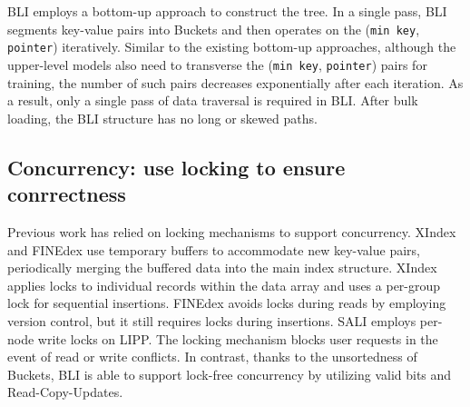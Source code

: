 BLI employs a bottom-up approach to construct the tree. In a single pass, BLI segments key-value pairs into Buckets and then operates on the (\texttt{min key}, \texttt{pointer}) iteratively. Similar to the existing bottom-up approaches, although the upper-level models also need to transverse the (\texttt{min key}, \texttt{pointer}) pairs for training, the number of such pairs decreases exponentially after each iteration. As a result, only a single pass of data traversal is required in BLI. After bulk loading, the BLI structure has no long or skewed paths.

\subsection{Concurrency: use locking to ensure conrrectness}
Previous work has relied on locking mechanisms to support concurrency. XIndex \cite{tang2020xindex} and FINEdex \cite{li2021finedex} use temporary buffers to accommodate new key-value pairs, periodically merging the buffered data into the main index structure. XIndex applies locks to individual records within the data array and uses a per-group lock for sequential insertions. FINEdex avoids locks during reads by employing version control, but it still requires locks during insertions. SALI \cite{ge2023sali} employs per-node write locks on LIPP. The locking mechanism blocks user requests in the event of read or write conflicts. In contrast, thanks to the unsortedness of Buckets, BLI is able to support lock-free concurrency by utilizing valid bits and Read-Copy-Updates.